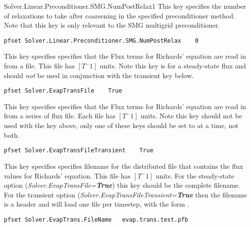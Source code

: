 {Solver.Linear.Preconditioner.SMG.NumPostRelax}{1}
{This key specifies the number of relaxations to take after coarsening in the
specified preconditioner method.  Note that this key is only relevant to
the SMG multigrid preconditioner.
}
\begin{display}\begin{verbatim}
pfset Solver.Linear.Preconditioner.SMG.NumPostRelax    0
\end{verbatim}\end{display}


{This key specifies specifies that the Flux terms for Richards' equation are read in from a  file.  This file has $[T^-1]$
units. Note this key is for a steady-state flux and should \emph{not} be used in conjunction with the transient key below.}
\begin{display}\begin{verbatim}
pfset Solver.EvapTransFile    True
\end{verbatim}\end{display}

{This key specifies specifies that the Flux terms for Richards' equation are read in from a series of flux  file.  Each file has $[T^-1]$
	units. Note this key should not be used with the key above, only one of these keys should be set to  at a time, not both.
}
\begin{display}\begin{verbatim}
pfset Solver.EvapTransFileTransient    True
\end{verbatim}\end{display}


{This key specifies specifies filename for the distributed  file that contains the flux values for Richards' equation.  This file has $[T^-1]$
units.  For the steady-state option (\emph{Solver.EvapTransFile=\bf{True}}) this key should be the complete filename.  For the transient option 
(\emph{Solver.EvapTransFileTransient=\bf{True}} then the filename is a header and \parflow{} will load one file per timestep, with the form .}
\begin{display}\begin{verbatim}
pfset Solver.EvapTrans.FileName   evap.trans.test.pfb
\end{verbatim}\end{display}

